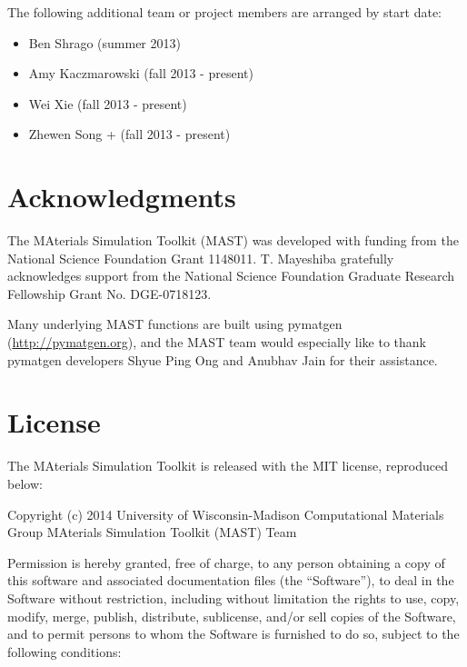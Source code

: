 \documentclass[letterpaper,10pt,english]{sphinxmanual}
\begin{document}
The following additional team or project members are arranged by start date:
\begin{itemize}
\item {} 
Ben Shrago (summer 2013)

\item {} 
Amy Kaczmarowski (fall 2013 - present)

\item {} 
Wei Xie (fall 2013 - present)

\item {} 
Zhewen Song + (fall 2013 - present)

\end{itemize}


\chapter{Acknowledgments}
\label{10_0_acknowledgments::doc}\label{10_0_acknowledgments:acknowledgments}

The MAterials Simulation Toolkit (MAST) was developed with funding from the National Science Foundation Grant 1148011. T. Mayeshiba gratefully acknowledges support from the National Science Foundation Graduate Research Fellowship Grant No. DGE-0718123.


Many underlying MAST functions are built using pymatgen (\href{http://pymatgen.org}{http://pymatgen.org}), and the MAST team would especially like to thank pymatgen developers Shyue Ping Ong and Anubhav Jain for their assistance.


\chapter{License}
\label{11_0_license::doc}\label{11_0_license:license}
The MAterials Simulation Toolkit is released with the MIT license, reproduced below:

Copyright (c) 2014 University of Wisconsin-Madison Computational Materials Group MAterials Simulation Toolkit (MAST) Team

Permission is hereby granted, free of charge, to any person obtaining a copy
of this software and associated documentation files (the ``Software''), to deal
in the Software without restriction, including without limitation the rights
to use, copy, modify, merge, publish, distribute, sublicense, and/or sell
copies of the Software, and to permit persons to whom the Software is
furnished to do so, subject to the following conditions:
\end{document}
